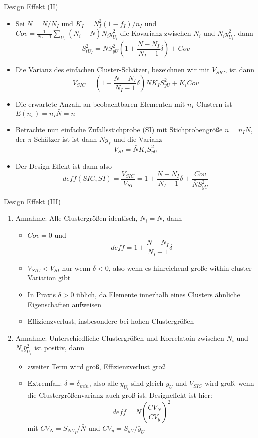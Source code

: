 \documentclass[9pt]{beamer}
\begin{document}
\begin{frame}{Design Effekt (II)}
\begin{itemize}
	\item Sei $\bar{N} = N/N_I$ und $K_I = N_I^2(1-f_I)/n_I$ und $Cov = \frac{1}{N_I-1} \sum_{U_I} (N_i - \bar{N})N_i \bar{y}^2_{U_i}$ die Kovarianz zwischen $N_i$ und $N_i \bar{y}^2_{U_i}$, dann
	$$ S_{tU_I}^2 = \bar{N}S_{yU}^2\left(1+\frac{N-N_I}{N_I-1}\delta\right)+ Cov$$
	\item Die Varianz des einfachen Cluster-Schätzer, bezeichnen wir mit $V_{SIC}$, ist dann
	$$V_{SIC} = \left(1+\frac{N-N_I}{N_I-1}\delta\right) \bar{N}K_I S_{yU}^2 + K_i Cov$$
	\item Die erwartete Anzahl an beobachtbaren Elementen mit $n_I$ Clustern ist $E(n_s)=n_I \bar{N} = n$
	\item Betrachte nun einfache Zufallsstichprobe (SI) mit Stichprobengröße $n=n_I \bar{N}$, der $\pi$ Schätzer ist ist dann $N\bar{y}_s$ und die Varianz $$V_{SI}=\bar{N}K_I S_{yU}^2$$
	\item Der Design-Effekt ist dann also
	$$ deff(SIC,SI) = \frac{V_{SIC}}{V_{SI}} = 1 + \frac{N-N_I}{N_I-1}\delta + \frac{Cov}{\bar{N}S_{yU}^2}$$
\end{itemize}
\end{frame}

\begin{frame}{Design Effekt (III)}

\begin{enumerate}
	\item Annahme: Alle Clustergrößen identisch, $N_i = \bar{N}$, dann 
	\begin{itemize}
		\item $Cov = 0$ und $$deff=1+\frac{N-N_I}{N_I-1}\delta$$
		\item $V_{SIC}< V_{SI}$ nur wenn $\delta < 0$, also wenn es hinreichend große within-cluster Variation gibt
		\item In Praxis $\delta >0$ üblich, da Elemente innerhalb eines Clusters ähnliche Eigenschaften aufweisen
		\item Effizienzverlust, insbesondere bei hohen Clustergrößen
	\end{itemize}
	\item Annahme: Unterschiedliche Clustergrößen und Korrelatoin zwischen $N_i$ und $N_i \bar{y}_{U_i}^2$ ist positiv, dann
	\begin{itemize}
		\item zweiter Term wird groß, Effizienzverlust groß
		\item Extremfall: $\delta = \delta_{min}$, also alle $\bar{y}_{U_i}$ sind gleich $\bar{y}_U$ und $V_{SIC}$ wird groß, wenn die Clustergrößenvarianz auch groß ist. Designeffekt ist hier:
		$$deff = \bar{N}\left(\frac{CV_N}{CV_y}\right)^2$$ mit $CV_N = S_{NU_I}/\bar{N}$ und $CV_y = S_{yU}/\bar{y}_U$
	\end{itemize}
\end{enumerate}
\end{frame}
\end{document}
